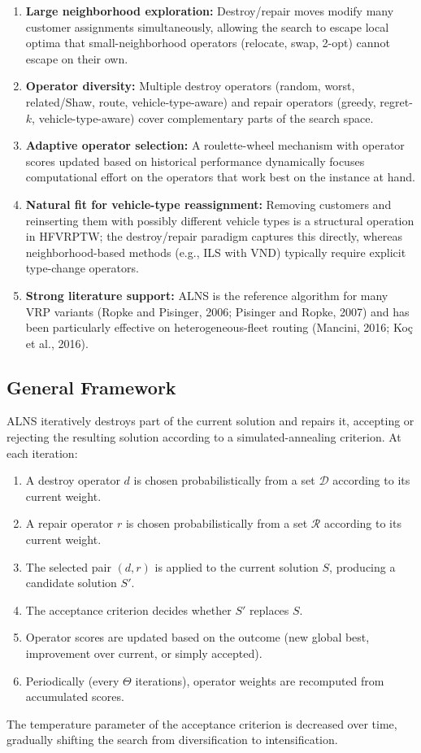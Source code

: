 \documentclass[11pt]{article}
\begin{document}
\begin{enumerate}[leftmargin=*]
    \item \textbf{Large neighborhood exploration:} Destroy/repair moves modify many customer assignments simultaneously, allowing the search to escape local optima that small-neighborhood operators (relocate, swap, 2-opt) cannot escape on their own.
    \item \textbf{Operator diversity:} Multiple destroy operators (random, worst, related/Shaw, route, vehicle-type-aware) and repair operators (greedy, regret-$k$, vehicle-type-aware) cover complementary parts of the search space.
    \item \textbf{Adaptive operator selection:} A roulette-wheel mechanism with operator scores updated based on historical performance dynamically focuses computational effort on the operators that work best on the instance at hand.
    \item \textbf{Natural fit for vehicle-type reassignment:} Removing customers and reinserting them with possibly different vehicle types is a structural operation in HFVRPTW; the destroy/repair paradigm captures this directly, whereas neighborhood-based methods (e.g., ILS with VND) typically require explicit type-change operators.
    \item \textbf{Strong literature support:} ALNS is the reference algorithm for many VRP variants (Ropke and Pisinger, 2006; Pisinger and Ropke, 2007) and has been particularly effective on heterogeneous-fleet routing (Mancini, 2016; Ko\c{c} et al., 2016).
\end{enumerate}

\subsection{General Framework}

ALNS iteratively destroys part of the current solution and repairs it, accepting or rejecting the resulting solution according to a simulated-annealing criterion. At each iteration:
\begin{enumerate}[leftmargin=*]
    \item A destroy operator $d$ is chosen probabilistically from a set $\mathcal{D}$ according to its current weight.
    \item A repair operator $r$ is chosen probabilistically from a set $\mathcal{R}$ according to its current weight.
    \item The selected pair $(d, r)$ is applied to the current solution $S$, producing a candidate solution $S'$.
    \item The acceptance criterion decides whether $S'$ replaces $S$.
    \item Operator scores are updated based on the outcome (new global best, improvement over current, or simply accepted).
    \item Periodically (every $\Theta$ iterations), operator weights are recomputed from accumulated scores.
\end{enumerate}
The temperature parameter of the acceptance criterion is decreased over time, gradually shifting the search from diversification to intensification.
\end{document}
